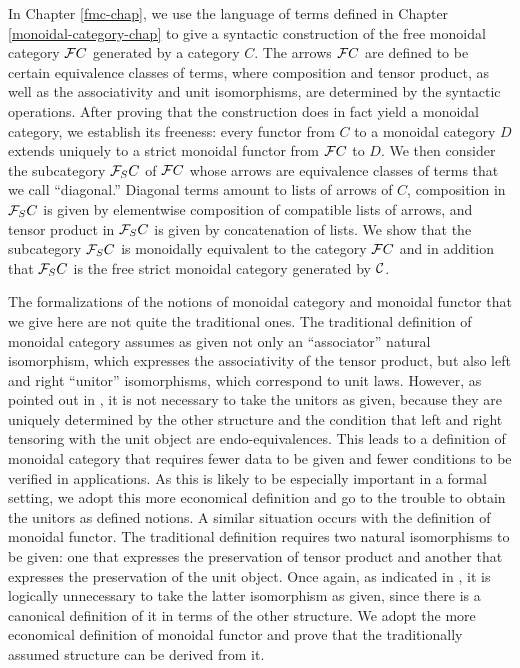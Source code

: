 \documentclass[11pt,notitlepage,a4paper]{report}
\begin{document}
In Chapter \ref{fmc-chap}, we use the language of terms defined in
Chapter \ref{monoidal-category-chap} to give a syntactic construction
of the free monoidal category ${\cal F}C$ generated by a category $C$.
The arrows ${\cal F}C$ are defined to be certain equivalence classes of terms,
where composition and tensor product, as well as the associativity and
unit isomorphisms, are determined by the syntactic operations.
After proving that the construction does in fact yield a monoidal category,
we establish its freeness: every functor from $C$ to a monoidal category $D$
extends uniquely to a strict monoidal functor from ${\cal F}C$ to $D$.
We then consider the subcategory ${\cal F}_S C$ of ${\cal F}C$ whose arrows
are equivalence classes of terms that we call ``diagonal.''
Diagonal terms amount to lists of arrows of $C$, composition in ${\cal F}_S C$
is given by elementwise composition of compatible lists of arrows,
and tensor product in ${\cal F}_S C$ is given by concatenation of lists.
We show that the subcategory ${\cal F}_S C$ is monoidally equivalent to
the category ${\cal F} C$ and in addition that ${\cal F}_S C$ is the free
strict monoidal category generated by ${\cal C}$.

The formalizations of the notions of monoidal category and monoidal functor
that we give here are not quite the traditional ones.  The traditional
definition of monoidal category assumes as given not only an ``associator''
natural isomorphism, which expresses the associativity of the tensor product,
but also left and right ``unitor'' isomorphisms, which correspond to unit laws.
However, as pointed out in \cite{Etingof15}, it is not necessary to take the
unitors as given, because they are uniquely determined by the other structure
and the condition that left and right tensoring with the unit object are
endo-equivalences.  This leads to a definition of monoidal category that
requires fewer data to be given and fewer conditions to be verified in
applications.  As this is likely to be especially important in a formal setting,
we adopt this more economical definition and go to the trouble to obtain
the unitors as defined notions.  A similar situation occurs with the
definition of monoidal functor.  The traditional definition requires two
natural isomorphisms to be given: one that expresses the preservation of 
tensor product and another that expresses the preservation of the unit object.
Once again, as indicated in \cite{Etingof15}, it is logically unnecessary
to take the latter isomorphism as given, since there is a canonical definition
of it in terms of the other structure.  We adopt the more economical
definition of monoidal functor and prove that the traditionally assumed
structure can be derived from it.
\end{document}

